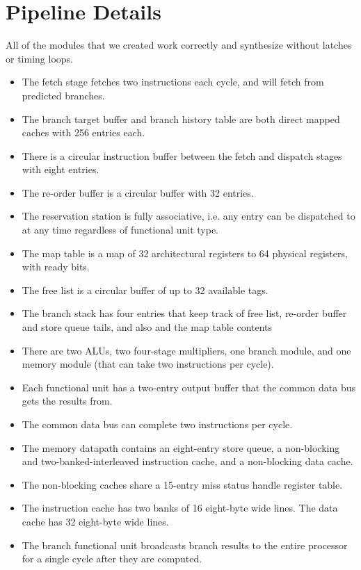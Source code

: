 \documentclass[10pt,journal,compsoc]{IEEEtran}
\begin{document}
\section{Pipeline Details}
All of the modules that we created work correctly and synthesize without latches or timing loops.
\begin{itemize}
\item The fetch stage fetches two instructions each cycle, and will fetch from predicted branches.
\item The branch target buffer and branch history table are both direct mapped caches with 256 entries each.
\item There is a circular instruction buffer between the fetch and dispatch stages with eight entries.
\item The re-order buffer is a circular buffer with 32 entries.
\item The reservation station is fully associative, i.e. any entry can be dispatched to at any time regardless of functional unit type.
\item The map table is a map of 32 architectural registers to 64 physical registers, with ready bits.
\item The free list is a circular buffer of up to 32 available tags.
\item The branch stack has four entries that keep track of free list, re-order buffer and store queue tails, and also and the map table contents
\item There are two ALUs, two four-stage multipliers, one branch module, and one memory module (that can take two instructions per cycle).
\item Each functional unit has a two-entry output buffer that the common data bus gets the results from.
\item The common data bus can complete two instructions per cycle.
\item The memory datapath contains an eight-entry store queue, a non-blocking and two-banked-interleaved instruction cache, and a non-blocking data cache.
\item The non-blocking caches share a 15-entry miss status handle register table.
\item The instruction cache has two banks of 16 eight-byte wide lines. The data cache has 32 eight-byte wide lines.
\item The branch functional unit broadcasts branch results to the entire processor for a single cycle after they are computed.
\end{itemize}
\end{document}
